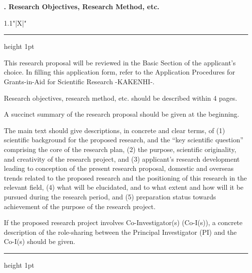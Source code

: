 \documentclass[8pt]{extarticle}
\makeatletter
\newcommand{\thickhline}{%
	\noalign {\ifnum 0=`}\fi \hrule height 1pt
	\futurelet \reserved@a \@xhline
}
\makeatother
\begin{document}
	
\noindent\textbf{\fontsize{12}{12}. Research Objectives, Research Method, etc.}\\
\begin{tabularx}{1.1\linewidth}{"|X|"}
	\thickhline
	This research proposal will be reviewed in the Basic Section of the applicant's choice. In filling this application form, refer to the Application Procedures for Grants-in-Aid for Scientific Research -KAKENHI-.
	
	Research objectives, research method, etc. should be described within 4 pages.
	
	A succinct summary of the research proposal should be given at the beginning.
	
	The main text should give descriptions, in concrete and clear terms, of (1) scientific background for the proposed research, and the ``key scientific question'' comprising the core of the research plan, (2) the purpose, scientific originality, and creativity of the research project, and (3) applicant's research development leading to conception of the present research proposal, domestic and overseas trends related to the proposed research and the positioning of this research in the relevant field, (4) what will be elucidated, and to what extent and how will it be pursued during the research period, and (5) preparation status towards achievement of the purpose of the research project. 
	
	If the proposed research project involves Co-Investigator(s) (Co-I(s)), a concrete description of the role-sharing between the Principal Investigator (PI) and the Co-I(s) should be given.
	\\
	\thickhline
\end{tabularx}
\end{document}
